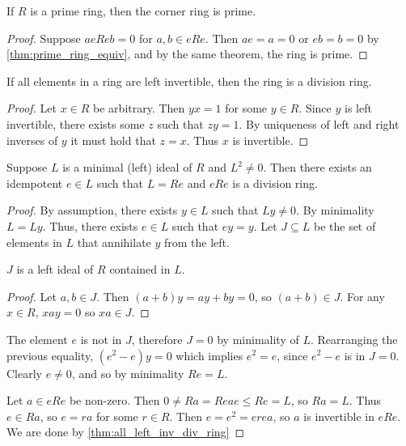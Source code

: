   \begin{theorem}
    \label{thm:corner_ring_prime}
    If $R$ is a prime ring, then the corner ring is prime.
  \end{theorem}
  \begin{proof}
    Suppose $aeReb = 0$ for $a, b \in eRe$. Then $ae = a = 0$ or $eb = b = 0$ by \ref{thm:prime_ring_equiv}, and by the same theorem, the ring is prime.
  \end{proof}

  \begin{theorem}
    \label{thm:all_left_inv_div_ring}
    If all elements in a ring are left invertible, then the ring is a division ring.
  \end{theorem}
  \begin{proof}
    Let $x \in R$ be arbitrary. Then $yx = 1$ for some $y \in R$. Since $y$ is left invertible, there exists some $z$ such that $zy = 1$. By uniqueness of left and right inverses of $y$ it must hold that $z = x$. Thus $x$ is invertible.
  \end{proof}

  \begin{theorem}
    \label{thm:brauer_lemma}
    Suppose $L$ is a minimal (left) ideal of $R$ and $L^2 \neq 0$. Then there exists an idempotent $e \in L$ such that $L = Re$ and $eRe$ is a division ring.
  \end{theorem}
  \begin{proof}
    By assumption, there exists $y \in L$ such that $Ly \neq 0$. By minimality $L = Ly$. Thus, there exists $e \in L$ such that $e y = y$. Let $J \subseteq L$ be the set of elements in $L$ that annihilate $y$ from the left.
    \begin{claim}
      $J$ is a left ideal of $R$ contained in $L$.
    \end{claim}
    \begin{proof}
      Let $a, b \in J$. Then $(a + b) y = a y + b y = 0$, so $(a + b) \in J$. For any $x \in R$, $x a y = 0$ so $xa \in J$. 
    \end{proof}
    The element $e$ is not in $J$, therefore $J = 0$ by minimality of $L$. 
    Rearranging the previous equality, $(e^2 - e) y = 0$ which implies $e^2 = e$, since $e^2 - e$ is in $J = 0$. Clearly $e \neq 0$, and so by minimality $Re = L$.

    Let $a \in eRe$ be non-zero. Then $0 \neq Ra = Reae \leq Re = L$, so $Ra = L$. Thus $e \in Ra$, so $e = r a$ for some $r \in R$. Then $e = e^2 = e r e a$, so $a$ is invertible in $eRe$. We are done by \ref{thm:all_left_inv_div_ring}
    
  \end{proof}

